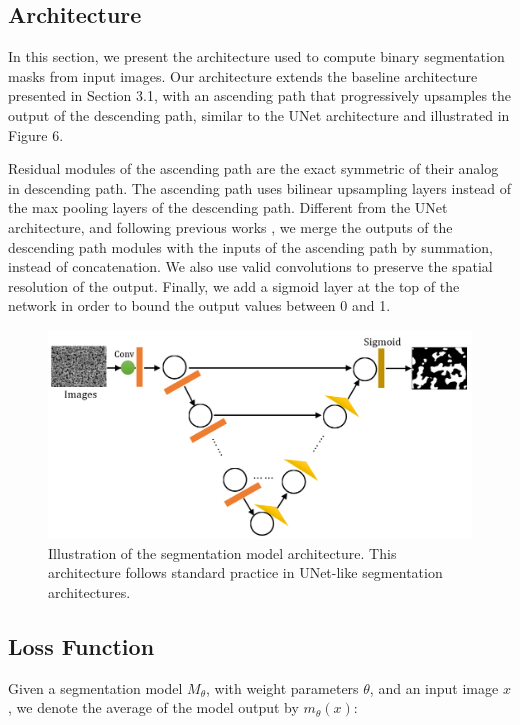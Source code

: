 \documentclass[10pt,twocolumn,letterpaper]{article}
\begin{document}
\subsection{Architecture}

% 
In this section, we present the architecture used 
to compute binary segmentation masks from input images.
Our architecture extends the baseline architecture presented in Section 3.1,
with an ascending path that progressively upsamples the output
of the descending path, similar to the UNet architecture \cite{ronneberger2015u} and illustrated in Figure 6.

Residual modules of the ascending path are the exact symmetric of their analog in descending path.
The ascending path uses bilinear upsampling layers 
instead of the max pooling layers of the descending path.
Different from the UNet architecture, and following previous works \cite{xxx},
we merge the outputs of the descending path modules with the inputs of the ascending path 
by summation, instead of concatenation. 
We also use valid convolutions to preserve the spatial resolution of the output.
Finally, we add a sigmoid layer at the top of the network in order to bound the output values between 0 and 1.

\begin{figure}[h]
\centering
\includegraphics[width=0.9\linewidth]{"./figures/Figure6"}
\caption{
Illustration of the segmentation model architecture.
This architecture follows standard practice in 
UNet-like segmentation architectures.
}
\end{figure}

\subsection{Loss Function}

Given a segmentation model $M_{\theta}$, 
with weight parameters $\theta$, 
and an input image $x$,
we denote the average of the model output by $m_{\theta}(x)$:
\end{document}
